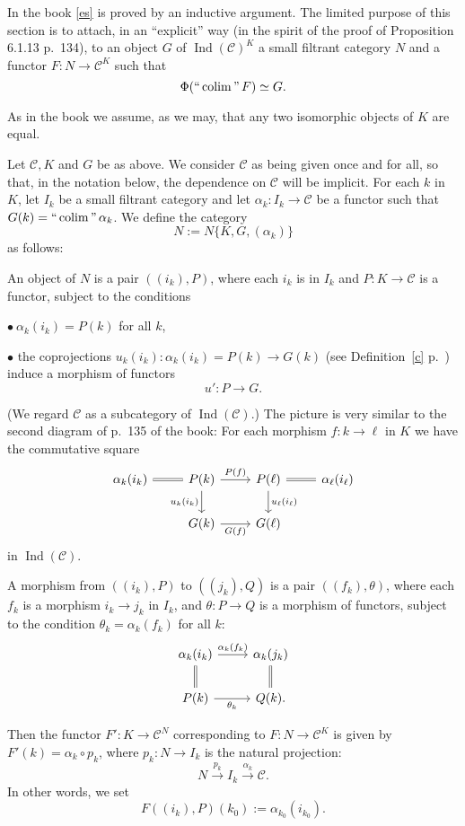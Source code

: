 \documentclass[12pt]{article}%
\theoremstyle{remark}
\theoremstyle{definition}
\newcommand{\bu}{\bullet}
\newcommand{\C}{\mathcal C}
\newcommand{\xr}{\xrightarrow}
\DeclareMathOperator*{\colim}{colim}
\DeclareMathOperator*{\ic}{``\colim"}
\DeclareMathOperator{\Ind}{Ind}
\begin{document}
In the book \eqref{es} is proved by an inductive argument. The limited purpose of this section is to attach, in an ``explicit'' way (in the spirit of the proof of Proposition 6.1.13 p.~134), to an object $G$ of $\Ind(\C)^K$ a small filtrant category $N$ and a functor $F:N\to\C^K$ such that 
$$ 
\Phi(\ic F)\simeq G. 
$$ 

As in the book we assume, as we may, that any two isomorphic objects of $K$ are equal. 

Let $\C,K$ and $G$ be as above. We consider $\C$ as being given once and for all, so that, in the notation below, the dependence on $\C$ will be implicit. For each $k$ in $K$, let $I_k$ be a small filtrant category and let $\alpha_k:I_k\to\C$ be a functor such that $G(k)=\ic\alpha_k$. We define the category 
$$
N:=N\{K,G,(\alpha_k)\}
$$ 
as follows:

An object of $N$ is a pair $((i_k),P)$, where each $i_k$ is in $I_k$ and $P:K\to\C$ is a functor, subject to the conditions 

\noindent$\bu\ \alpha_k(i_k)=P(k)$ for all $k$, 

\noindent$\bu$ the coprojections $u_k(i_k):\alpha_k(i_k)=P(k)\to G(k)$ (see Definition~\ref{c} p.~\pageref{c}) induce a morphism of functors 
%
\begin{equation}\label{u':}
u':P\to G.
\end{equation}

\noindent(We regard $\C$ as a subcategory of $\Ind(\C)$.) The picture is very similar to the second diagram of p.~135 of the book: For each morphism $f:k\to\ell$ in $K$ we have the commutative square 
$$ 
\begin{tikzcd} 
\alpha_k(i_k)\ar[equal]{r}&P(k)\ar{r}{P(f)}\ar{d}[swap]{u_k(i_k)}&P(\ell)\ar{d}{u_\ell(i_\ell)}\ar[equal]{r}&\alpha_\ell(i_\ell)\\ 
{}&G(k)\ar{r}[swap]{G(f)}&G(\ell) 
\end{tikzcd} 
$$ 
in $\Ind(\C)$. 

A morphism from $((i_k),P)$ to $((j_k),Q)$ is a pair $((f_k),\theta)$, where each $f_k$ is a morphism $i_k\to j_k$ in $I_k$, and $\theta:P\to Q$ is a morphism of functors, subject to the condition $\theta_k=\alpha_k(f_k)$ for all $k$: 
$$ 
\begin{tikzcd} 
\alpha_k(i_k)\ar{r}{\alpha_k(f_k)}\ar[equal]{d}&\alpha_k(j_k)\ar[equal]{d}\\ 
P(k)\ar{r}[swap]{\theta_k}&Q(k).
\end{tikzcd} 
$$ 

Then the functor $F':K\to\C^N$ corresponding to $F:N\to\C^K$ is given by $F'(k)=\alpha_k\circ p_k$, where $p_k:N\to I_k$ is the natural projection: 
$$
N\xr{p_k}I_k\xr{\alpha_k}\C.
$$ 
In other words, we set
$$
F((i_k),P)(k_0):=\alpha_{k_0}(i_{k_0}).
$$ 
\end{document}
